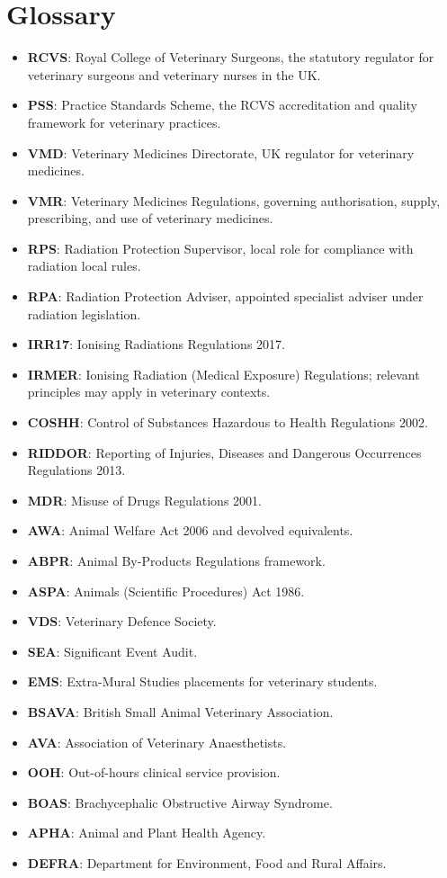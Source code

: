 \chapter{Glossary}
\label{app:Glossary}

\begin{itemize}
  \item \textbf{RCVS}: Royal College of Veterinary Surgeons, the statutory regulator for veterinary surgeons and veterinary nurses in the UK.
  \item \textbf{PSS}: Practice Standards Scheme, the RCVS accreditation and quality framework for veterinary practices.
  \item \textbf{VMD}: Veterinary Medicines Directorate, UK regulator for veterinary medicines.
  \item \textbf{VMR}: Veterinary Medicines Regulations, governing authorisation, supply, prescribing, and use of veterinary medicines.
  \item \textbf{RPS}: Radiation Protection Supervisor, local role for compliance with radiation local rules.
  \item \textbf{RPA}: Radiation Protection Adviser, appointed specialist adviser under radiation legislation.
  \item \textbf{IRR17}: Ionising Radiations Regulations 2017.
  \item \textbf{IRMER}: Ionising Radiation (Medical Exposure) Regulations; relevant principles may apply in veterinary contexts.
  \item \textbf{COSHH}: Control of Substances Hazardous to Health Regulations 2002.
  \item \textbf{RIDDOR}: Reporting of Injuries, Diseases and Dangerous Occurrences Regulations 2013.
  \item \textbf{MDR}: Misuse of Drugs Regulations 2001.
  \item \textbf{AWA}: Animal Welfare Act 2006 and devolved equivalents.
  \item \textbf{ABPR}: Animal By-Products Regulations framework.
  \item \textbf{ASPA}: Animals (Scientific Procedures) Act 1986.
  \item \textbf{VDS}: Veterinary Defence Society.
  \item \textbf{SEA}: Significant Event Audit.
  \item \textbf{EMS}: Extra-Mural Studies placements for veterinary students.
  \item \textbf{BSAVA}: British Small Animal Veterinary Association.
  \item \textbf{AVA}: Association of Veterinary Anaesthetists.
  \item \textbf{OOH}: Out-of-hours clinical service provision.
  \item \textbf{BOAS}: Brachycephalic Obstructive Airway Syndrome.
  \item \textbf{APHA}: Animal and Plant Health Agency.
  \item \textbf{DEFRA}: Department for Environment, Food and Rural Affairs.
\end{itemize}
